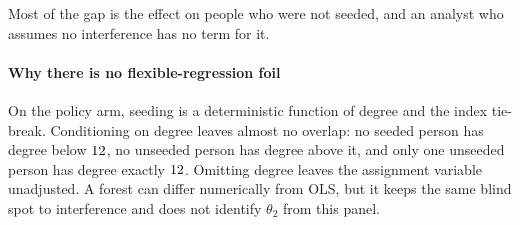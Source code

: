 Most of the gap is the effect on people who were not seeded, and an analyst who
assumes no interference has no term for it.

\paragraph{Why there is no flexible-regression foil} On the policy arm, seeding is
a deterministic function of degree and the index tie-break. Conditioning on degree
leaves almost no overlap: no seeded person has degree below $12$, no
unseeded person has degree above it, and only one unseeded person has degree
exactly $12$. Omitting degree leaves the assignment variable unadjusted. A
forest can differ numerically from OLS, but it keeps the same blind spot to
interference and does not identify $\theta_2$ from this panel.
